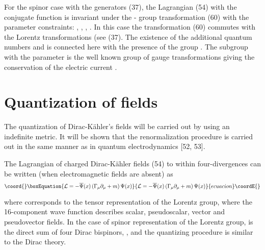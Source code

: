 \documentclass[a4paper,12pt]{article}
\begin{document}
For the spinor case with the generators (37), the Lagrangian (54)
with the conjugate function \coordHE{} is invariant under the \coordHE{} - group
transformation (60) with the parameter constraints: \myHighlight{$\alpha
^{*}=-\alpha $}\coordHE{}, \myHighlight{$\beta _\mu ^{*}=-\beta _\mu $}\coordHE{}, \myHighlight{$\omega _{\mu \nu
}^{*}=\omega _{\mu \nu }$}\coordHE{}, \myHighlight{$\delta _\mu ^{*}=\delta _\mu ,$}\coordHE{}  \myHighlight{$\xi
^{*}=-\xi $}\coordHE{} . In this case the transformation (60) commutes with
the Lorentz transformations (see (37). The existence of the
additional quantum numbers \coordHE{} and
\myHighlight{$\overline{\varepsilon }$}\coordHE{} is connected here with the presence of
the group \coordHE{}. The subgroup \coordHE{} with the parameter \myHighlight{$ \alpha
$}\coordHE{} is the well known group of gauge transformations giving the
conservation of the electric current \coordHE{}.

\section{Quantization of fields}

The quantization of Dirac-K\"ahler's fields will be carried out by using an
indefinite metric. It will be shown that the renormalization procedure is
carried out in the same manner as in quantum electrodynamics [52, 53].

The Lagrangian of charged Dirac-K\"ahler fields (54) to within
four-divergences can be written (when electromagnetic fields are absent) as
\begin{equation}\coord{}\boxEquation{
\mathcal{L}=-\overline{\Psi }(x)\left( \Gamma _\mu \partial _\mu +m\right)
\Psi (x)  \label{63}
}{
\mathcal{L}=-\overline{\Psi }(x)\left( \Gamma _\mu \partial _\mu +m\right)
\Psi (x)  }{ecuacion}\coordE{}\end{equation}

where \coordHE{} corresponds to the tensor representation of the Lorentz
group, where the 16-component wave function \myHighlight{$\Psi $}\coordHE{} describes
scalar, pseudoscalar, vector and pseudovector fields. In the case
of spinor representation of the Lorentz group, \myHighlight{$\Psi $}\coordHE{} is the
direct sum of four Dirac bispinors, \coordHE{}, and the quantizing procedure is similar to the
Dirac theory.
\end{document}
